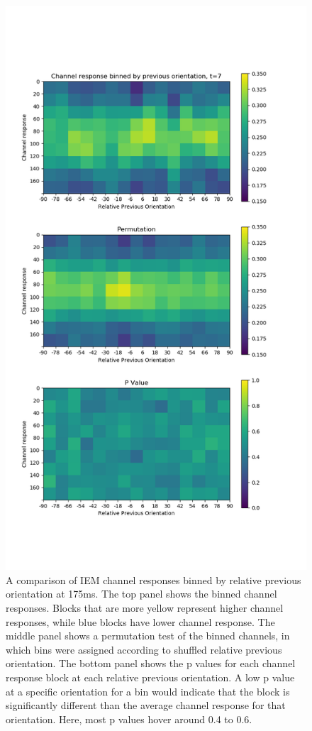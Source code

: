 \documentclass[../main.tex]{subfiles}
\begin{document}
\begin{figure}
    \centering
    \includegraphics[scale=0.5]{figures/results/sd_all_t7.png}
    \caption{A comparison of IEM channel responses binned by relative previous orientation at 175ms. The top panel shows the binned channel responses. Blocks that are more yellow represent higher channel responses, while blue blocks have lower channel response. The middle panel shows a permutation test of the binned channels, in which bins were assigned according to shuffled relative previous orientation. The bottom panel shows the p values for each channel response block at each relative previous orientation. A low p value at a specific orientation for a bin would indicate that the block is significantly different than the average channel response for that orientation. Here, most p values hover around 0.4 to 0.6. }
    \label{sd_all_t7}
\end{figure}
\end{document}
